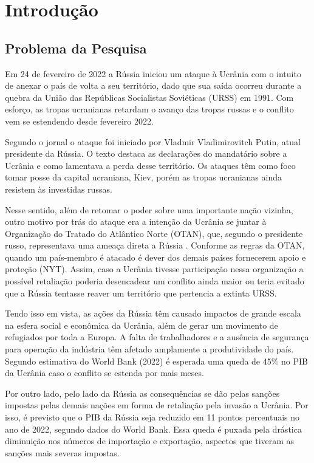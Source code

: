 \documentclass[12pt]{article}
\begin{document}
\tableofcontents
\pagebreak

\listoftables
\pagebreak

\listoffigures
\pagebreak

\section{Introdução}
\subsection{Problema da Pesquisa}
Em 24 de fevereiro de 2022 a Rússia iniciou um ataque à Ucrânia com o intuito de anexar o país de volta a seu território, dado que sua saída ocorreu durante a quebra da União das Repúblicas Socialistas Soviéticas (URSS) em 1991. Com esforço, as tropas ucranianas retardam o avanço das tropas russas e o conflito vem se estendendo desde fevereiro 2022.

Segundo o jornal \cite{rootsWarNYT22} o ataque foi iniciado por Vladmir Vladimirovitch Putin, atual presidente da Rússia. O texto destaca as declarações do mandatário sobre a Ucrânia e como lamentava a perda desse território. Os ataques têm como foco tomar posse da capital ucraniana, Kiev, porém as tropas ucranianas ainda resistem às investidas russas. 

Nesse sentido, além de retomar o poder sobre uma importante nação vizinha, outro motivo por trás do ataque era a intenção da Ucrânia se juntar à Organização do Tratado do Atlântico Norte (OTAN), que, segundo o presidente russo, representava uma ameaça direta a Rússia \cite{natoNYT}. Conforme as regras da OTAN, quando um país-membro é atacado é dever dos demais países fornecerem apoio e proteção (NYT). Assim, caso a Ucrânia tivesse participação nessa organização a possível retaliação poderia desencadear um conflito ainda maior ou teria evitado que a Rússia tentasse reaver um território que pertencia a extinta URSS.

Tendo isso em vista, as ações da Rússia têm causado impactos de grande escala na esfera social e econômica da Ucrânia, além de gerar um movimento de refugiados por toda a Europa. A falta de trabalhadores e a ausência de segurança para operação da indústria têm afetado amplamente a produtividade do país. Segundo estimativa do World Bank (2022) é esperada uma queda de 45\% no PIB da Ucrânia caso o conflito se estenda por mais meses.

Por outro lado, pelo lado da Rússia as consequências se dão pelas sanções impostas pelas demais nações em forma de retaliação pela invasão a Ucrânia. Por isso, é previsto que o PIB da Rússia seja reduzido em 11 pontos percentuais no ano de 2022, segundo dados do World Bank. Essa queda é puxada pela drástica diminuição nos números de importação e exportação, aspectos que tiveram as sanções mais severas impostas.
\end{document}

